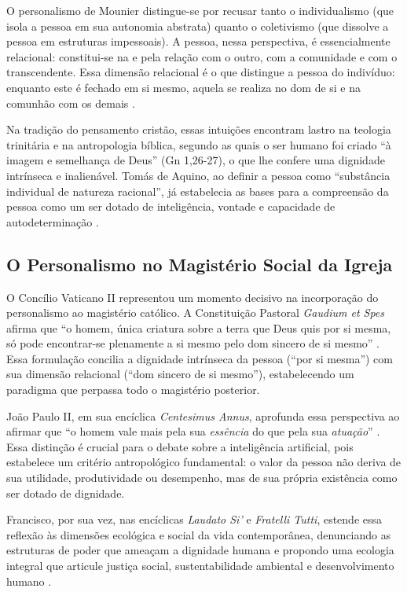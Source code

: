O personalismo de Mounier distingue-se por recusar tanto o individualismo (que isola a pessoa em sua autonomia abstrata) quanto o coletivismo (que dissolve a pessoa em estruturas impessoais). A pessoa, nessa perspectiva, é essencialmente relacional: constitui-se na e pela relação com o outro, com a comunidade e com o transcendente. Essa dimensão relacional é o que distingue a pessoa do indivíduo: enquanto este é fechado em si mesmo, aquela se realiza no dom de si e na comunhão com os demais \cite{Ricoeur1990SM}.

Na tradição do pensamento cristão, essas intuições encontram lastro na teologia trinitária e na antropologia bíblica, segundo as quais o ser humano foi criado ``à imagem e semelhança de Deus'' (Gn 1,26-27), o que lhe confere uma dignidade intrínseca e inalienável. Tomás de Aquino, ao definir a pessoa como ``substância individual de natureza racional'', já estabelecia as bases para a compreensão da pessoa como um ser dotado de inteligência, vontade e capacidade de autodeterminação \cite{AquinoST}.

\subsection{O Personalismo no Magistério Social da Igreja}
\label{subsec:magisterio-social}

O Concílio Vaticano II representou um momento decisivo na incorporação do personalismo ao magistério católico. A Constituição Pastoral \textit{Gaudium et Spes} afirma que ``o homem, única criatura sobre a terra que Deus quis por si mesma, só pode encontrar-se plenamente a si mesmo pelo dom sincero de si mesmo'' \cite{ConcilioVaticanoII1965GS}. Essa formulação concilia a dignidade intrínseca da pessoa (``por si mesma'') com sua dimensão relacional (``dom sincero de si mesmo''), estabelecendo um paradigma que perpassa todo o magistério posterior.

João Paulo II, em sua encíclica \textit{Centesimus Annus}, aprofunda essa perspectiva ao afirmar que ``o homem vale mais pela sua \textit{essência} do que pela sua \textit{atuação}'' \cite{JoaoPauloII1991CA}. Essa distinção é crucial para o debate sobre a inteligência artificial, pois estabelece um critério antropológico fundamental: o valor da pessoa não deriva de sua utilidade, produtividade ou desempenho, mas de sua própria existência como ser dotado de dignidade.

Francisco, por sua vez, nas encíclicas \textit{Laudato Si'} e \textit{Fratelli Tutti}, estende essa reflexão às dimensões ecológica e social da vida contemporânea, denunciando as estruturas de poder que ameaçam a dignidade humana e propondo uma ecologia integral que articule justiça social, sustentabilidade ambiental e desenvolvimento humano \cite{Francisco2015LS, Francisco2020FT}.

